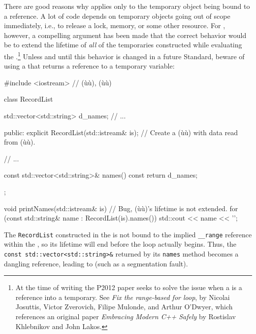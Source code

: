 {{{There are good reasons why  applies only to
the temporary object being bound to a reference. A lot of code depends
on temporary objects going out of scope immediately, i.e., to release a
lock, memory, or some other resource. For , however, a compelling argument has been made that
the correct behavior would be to extend the lifetime of \emph{all} of
the temporaries constructed while evaluating the .{\cprotect\footnote{At the time of writing the P2012 paper
seeks to solve the issue when a  is a
reference into a temporary. See \emph{Fix the range-based for loop},
by Nicolai Josuttis, Victor Zverovich, Filipe Mulonde, and Arthur
O'Dwyer, which references an original paper
\emph{Embracing Modern C++ Safely} by Rostislav Khlebnikov and John
  Lakos.}} Unless and until this behavior is changed in a future
Standard, beware of using a  that returns a
reference to a temporary variable:

\begin{emcppslisting}[emcppsbatch=e4]
#include <iostream>  // (ù{}ù), (ù{}ù)

class RecordList
{
    std::vector<std::string> d_names;
    // ...

public:
    explicit RecordList(std::istream& is);
        // Create a (ù{}ù) with data read from (ù{}ù).

    // ...

    const std::vector<std::string>& names() const { return d_names; }
};

void printNames(std::istream& is)
{
    // Bug, (ù{}ù)'s lifetime is not extended.
    for (const std::string& name : RecordList(is).names())
    {
        std::cout << name << '\n';
    }
}
\end{emcppslisting}


\noindent The \lstinline!RecordList! constructed in the  is
not bound to the implied \lstinline!__range! reference within the
, so its lifetime will end before
the loop actually begins. Thus, the
\lstinline!const!~\lstinline!std::vector<std::string>&! returned by its
\lstinline!names! method becomes a dangling reference, leading to
 (such as a segmentation fault).

}}}
